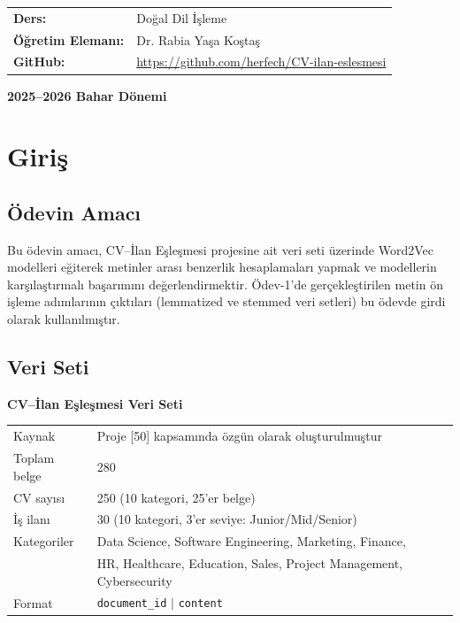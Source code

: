 \documentclass[12pt, a4paper]{article}
\begin{document}
\begin{titlepage}
\vspace{0.8cm}
\begin{tabular}{ll}
    \textbf{Ders:}             & Doğal Dil İşleme \\[0.2cm]
    \textbf{Öğretim Elemanı:}  & Dr. Rabia Yaşa Koştaş \\[0.2cm]
    \textbf{GitHub:}           & \url{https://github.com/herfech/CV-ilan-eslesmesi} \\
\end{tabular}

\vfill
{\color{anarenk}\bfseries 2025--2026 Bahar Dönemi}
\end{titlepage}

\tableofcontents
\newpage

\section{Giriş}

\subsection{Ödevin Amacı}

Bu ödevin amacı, CV--İlan Eşleşmesi projesine ait veri seti üzerinde Word2Vec modelleri eğiterek metinler arası benzerlik hesaplamaları yapmak ve modellerin karşılaştırmalı başarımını değerlendirmektir. Ödev-1'de gerçekleştirilen metin ön işleme adımlarının çıktıları (lemmatized ve stemmed veri setleri) bu ödevde girdi olarak kullanılmıştır.

\subsection{Veri Seti}

\begin{mdframed}[style=bilgi]
\textbf{CV--İlan Eşleşmesi Veri Seti}\\[0.3cm]
\begin{tabular}{ll}
Kaynak       & Proje [50] kapsamında özgün olarak oluşturulmuştur \\
Toplam belge & 280 \\
CV sayısı    & 250 (10 kategori, 25'er belge) \\
İş ilanı     & 30 (10 kategori, 3'er seviye: Junior/Mid/Senior) \\
Kategoriler  & Data Science, Software Engineering, Marketing, Finance, \\
             & HR, Healthcare, Education, Sales, Project Management, Cybersecurity \\
Format       & \texttt{document\_id} $|$ \texttt{content} \\
\end{tabular}
\end{mdframed}
\end{document}
